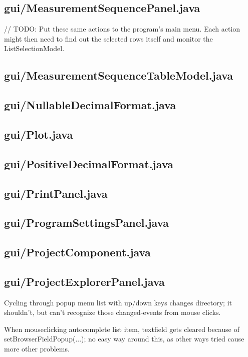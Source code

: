 \subsection{gui/MeasurementSequencePanel.java}
        // TODO: Put these same actions to the program's main menu. Each action might then need to find out the selected rows itself and monitor the ListSelectionModel.

\subsection{gui/MeasurementSequenceTableModel.java}

\subsection{gui/NullableDecimalFormat.java}

\subsection{gui/Plot.java}

\subsection{gui/PositiveDecimalFormat.java}

\subsection{gui/PrintPanel.java}

\subsection{gui/ProgramSettingsPanel.java}

\subsection{gui/ProjectComponent.java}


\subsection{gui/ProjectExplorerPanel.java}

Cycling through popup menu list with up/down keys changes directory; it shouldn't, but can't recognize those changed-events from mouse clicks.

When mouseclicking autocomplete list item, textfield gets cleared because of setBrowserFieldPopup(...); no easy way around this, as other ways tried cause more other problems.

